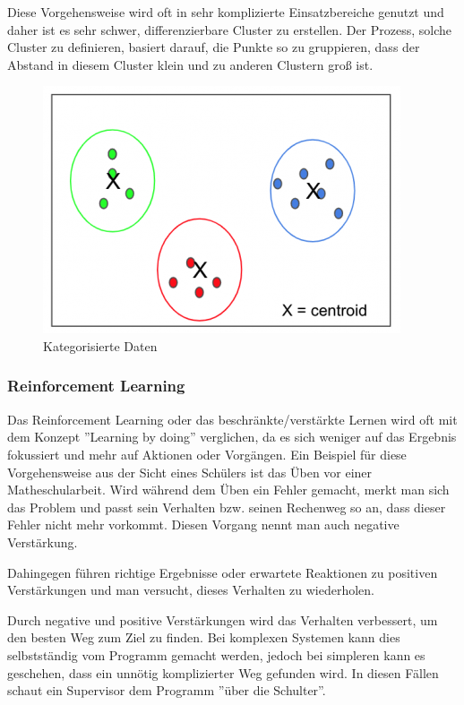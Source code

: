 Diese Vorgehensweise wird oft in sehr komplizierte Einsatzbereiche genutzt und daher ist es sehr schwer, differenzierbare Cluster zu erstellen. Der Prozess, solche Cluster zu definieren, basiert darauf, die Punkte so zu gruppieren, dass der Abstand in diesem Cluster klein und zu anderen Clustern groß ist.

\begin{figure}[H]
      \centering
      \includegraphics[scale=0.8]{sections/machine-learning/images/clustered-data.png}
      \caption{Kategorisierte Daten}
      \label{fig:clustered-data}
\end{figure}

\subsubsection{Reinforcement Learning}

Das Reinforcement Learning oder das beschränkte/verstärkte Lernen wird oft mit dem Konzept ''Learning by doing'' verglichen, da es sich weniger auf das Ergebnis fokussiert und mehr auf Aktionen oder Vorgängen. Ein Beispiel für diese Vorgehensweise aus der Sicht eines Schülers ist das Üben vor einer Matheschularbeit. Wird während dem Üben ein Fehler gemacht, merkt man sich das Problem und passt sein Verhalten bzw. seinen Rechenweg so an, dass dieser Fehler nicht mehr vorkommt. Diesen Vorgang nennt man auch negative Verstärkung. \cite{SL:online}

Dahingegen führen richtige Ergebnisse oder erwartete Reaktionen zu positiven Verstärkungen und man versucht, dieses Verhalten zu wiederholen.

Durch negative und positive Verstärkungen wird das Verhalten verbessert, um den besten Weg zum Ziel zu finden. Bei komplexen Systemen kann dies selbstständig vom Programm gemacht werden, jedoch bei simpleren kann es geschehen, dass ein unnötig komplizierter Weg gefunden wird. In diesen Fällen schaut ein Supervisor dem Programm ''über die Schulter''.